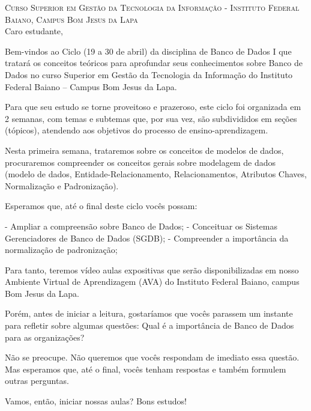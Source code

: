 \noindent \textsc{Curso Superior em Gestão da Tecnologia da Informação - Instituto Federal Baiano, Campus Bom Jesus da Lapa}\\

\noindent 
Caro estudante,

Bem-vindos ao Ciclo (19 a 30 de abril) da disciplina de Banco de Dados I que tratará os conceitos teóricos para aprofundar seus conhecimentos sobre Banco de Dados no curso Superior em Gestão da Tecnologia da Informação do Instituto Federal Baiano – Campus Bom Jesus da Lapa.

Para que seu estudo se torne proveitoso e prazeroso, este ciclo foi organizada em 2 semanas, com temas e subtemas que, por sua vez, são subdivididos em seções (tópicos), atendendo aos objetivos do processo de ensino-aprendizagem.

Nesta primeira semana, trataremos sobre os conceitos de modelos de dados, procuraremos compreender os conceitos gerais sobre modelagem de dados (modelo de dados, Entidade-Relacionamento, Relacionamentos, Atributos Chaves, Normalização e Padronização).  


Esperamos que, até o final deste ciclo vocês possam:

- Ampliar a compreensão sobre Banco de Dados;
- Conceituar os Sistemas Gerenciadores de Banco de Dados (SGDB);
- Compreender a importância da normalização de padronização;

Para tanto, teremos vídeo aulas expositivas que serão disponibilizadas em nosso Ambiente Virtual de Aprendizagem (AVA) do Instituto Federal Baiano, campus Bom Jesus da Lapa.

Porém, antes de iniciar a leitura, gostaríamos que vocês parassem um instante para refletir sobre algumas questões: Qual é a importância de Banco de Dados para as organizações?

Não se preocupe.  Não queremos que vocês respondam de imediato essa questão.  Mas esperamos que, até o final, vocês tenham respostas e também formulem outras perguntas.

Vamos, então, iniciar nossas aulas? Bons estudos!

